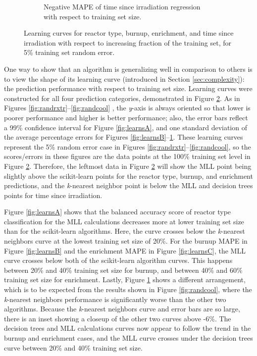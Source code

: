 \begin{figure}[!htb]
\begin{subfigure}[b]{0.50\textwidth}
    \caption{Negative \gls{MAPE} of time since irradiation regression with 
             respect to training set size.}
    \label{fig:learnsD}
  \end{subfigure}
  \caption[Learning curves for all four prediction parameters]
          {Learning curves for reactor type, burnup, enrichment, and time 
           since irradiation with respect to increasing fraction of the 
           training set, for 5\% training set random error.}
  \label{fig:learns}
\end{figure}

One way to show that an algorithm is generalizing well in comparison to others
is to view the shape of its learning curve (introduced in Section
\ref{sec:complexity}): the prediction performance with respect to training set
size.  Learning curves were constructed for all four prediction categories,
demonstrated in Figure \ref{fig:learns}. As in Figures
\ref{fig:randrxtr}--\ref{fig:randcool} , the \textit{y}-axis is always oriented
so that lower is poorer performance and higher is better performance; also, the
error bars reflect a 99\% confidence interval for Figure \ref{fig:learnsA}, and
one standard deviation of the average percentage errors for Figures
\ref{fig:learnsB}--\ref{fig:learnsD}.  These learning curves represent the 5\%
random error case in Figures \ref{fig:randrxtr}--\ref{fig:randcool}, so the
scores/errors in these figures are the data points at the 100\% training set
level in Figure \ref{fig:learns}.  Therefore, the leftmost data in Figure
\ref{fig:learns} will show the \gls{MLL} point being slightly above the
scikit-learn points for the reactor type, burnup, and enrichment predictions,
and the \textit{k}-nearest neighbor point is below the \gls{MLL} and decision
trees points for time since irradiation.  

Figure \ref{fig:learnsA} shows that the balanced accuracy score of reactor type
classification for the \gls{MLL} calculations decreases more at lower training
set size than for the scikit-learn algorithms. Here, the curve crosses below
the \textit{k}-nearest neighbors curve at the lowest training set size of 20\%.
For the burnup \gls{MAPE} in Figure \ref{fig:learnsB} and the enrichment
\gls{MAPE} in Figure \ref{fig:learnsC}, the \gls{MLL} curve crosses below both
of the scikit-learn algorithm curves. This happens between 20\% and 40\%
training set size for burnup, and between 40\% and 60\% training set size for
enrichment.  Lastly, Figure \ref{fig:learnsD} shows a different arrangement,
which is to be expected from the results shown in Figure \ref{fig:randcool},
where the \textit{k}-nearest neighbors performance is significantly worse than
the other two algorithms. Because the \textit{k}-nearest neighbors curve and
error bars are so large, there is an inset showing a closeup of the other two
curves above -6\%.  The decision trees and \gls{MLL} calculations curves now
appear to follow the trend in the burnup and enrichment cases, and the
\gls{MLL} curve crosses under the decision trees curve between 20\% and 40\%
training set size.  

